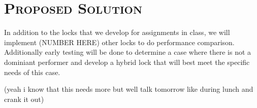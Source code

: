 \documentclass[finalProject.tex]{subfiles}
\begin{document}
\bigskip

\section*{\textsc{\Large Proposed Solution}}

In addition to the locks that we develop for assignments in class, we will implement (NUMBER HERE) other locks to do performance comparison. Additionally early testing will be done to determine a case where there is not a dominiant performer and develop a hybrid lock that will best meet the specific needs of this case.

(yeah i know that this needs more but well talk tomorrow like during lunch and crank it out)
\end{document}
